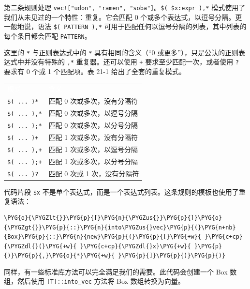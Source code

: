 第二条规则处理 \texttt{vec!["udon", "ramen", "soba"]}。\texttt{\$( \$x:expr ),*} 模式使用了我们从未见过的一个特性：重复。它会匹配 0 个或多个表达式，以逗号分隔。更一般地说，语法 \texttt{\$( PATTERN ),*} 可用于匹配任何以逗号分隔的列表，其中列表的每个条目都会匹配 \texttt{PATTERN}。

这里的 \texttt{*} 与正则表达式中的 \texttt{*} 具有相同的含义（“0 或更多”），只是公认的正则表达式中并没有特殊的 \texttt{,*} 重复器。还可以使用 \texttt{+} 要求至少匹配一次，或者使用 \texttt{?} 要求有 0 个或 1 个匹配项。表 21-1 给出了全套的重复模式。


\myTableBegin
\begin{tabularx}{\textwidth}{@{}>{\hsize=1.037\hsize\raggedright\arraybackslash}X>{\hsize=0.963\hsize\raggedright\arraybackslash}X@{}}
\rowcolor{tabhead}\textcolor{white}{模式} & \textcolor{white}{含义} \\
\texttt{\$( ... )*} & 匹配 0 次或多次，没有分隔符 \\
\texttt{\$( ... ),*} & 匹配 0 次或多次，以逗号分隔 \\
\texttt{\$( ... );*} & 匹配 0 次或多次，以分号分隔 \\
\texttt{\$( ... )+} & 匹配 1 次或多次，没有分隔符 \\
\texttt{\$( ... ),+} & 匹配 1 次或多次，以逗号分隔 \\
\texttt{\$( ... );+} & 匹配 1 次或多次，以分号分隔 \\
\texttt{\$( ... )?} & 匹配 0 次或 1 次，没有分隔符 \\
\end{tabularx}
\myTableEnd

代码片段 \texttt{\$x} 不是单个表达式，而是一个表达式列表。这条规则的模板也使用了重复语法：

\begin{Verbatim}[commandchars=\\\{\},breaklines=true,breakanywhere=true,fontsize=\codefont,xleftmargin=17bp]
\PYG{o}{\PYGZlt{}}\PYG{p}{[}\PYG{n}{\PYGZus{}}\PYG{p}{]}\PYG{o}{\PYGZgt{}}\PYG{p}{::}\PYG{n}{into\PYGZus{}vec}\PYG{p}{(}\PYG{n+nb}{Box}\PYG{p}{::}\PYG{n}{new}\PYG{p}{(}\PYG{p}{[}\PYG{+w}{ }\PYG{c+cp}{\PYGZdl{}(}\PYG{+w}{ }\PYG{c+cp}{\PYGZdl{}x}\PYG{+w}{ }\PYG{p}{)}\PYG{p}{,}\PYG{o}{*}\PYG{+w}{ }\PYG{p}{]}\PYG{p}{)}\PYG{p}{)}
\end{Verbatim}

同样，有一些标准库方法可以完全满足我们的需要。此代码会创建一个 Box 数组，然后使用 \texttt{[T]::into\_vec} 方法将 Box 数组转换为向量。

